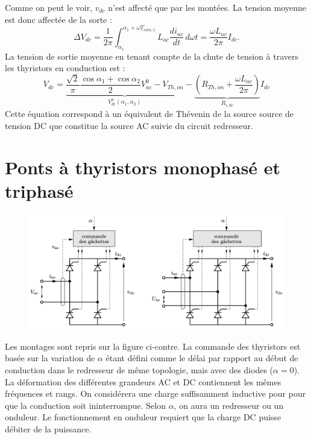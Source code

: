 				Comme on peut le voir, $v_{dc}$ n'est affecté que par les montées. La tension moyenne est donc affectée de la sorte : 
				\begin{equation}
					\Delta V_{dc} = \frac{1}{2\pi} \int _{\alpha _1} ^{\alpha _1 + \omega T_{com,1}} L_{ac} \frac{di_{ac}}{dt} \, d\omega t = \frac{\omega L_{ac}}{2\pi} I_{dc}. 
				\end{equation}
				La tension de sortie moyenne en tenant compte de la chute de tension à travers les thyristors en conduction est :
				\begin{equation}
				V_{dc} = \underbrace{\frac{\sqrt{2}}{\pi} \frac{\cos \alpha _1 + \cos \alpha _2}{2} V_{ac}^0 - V_{Th,on}}_{V_{dc}^0(\alpha _1,\alpha _2)} - \underbrace{\left( R_{Th,on} + \frac{\omega L_{ac}}{2\pi} \right)}_{R_{i,dc}}I_{dc}
				\end{equation}
				Cette équation correspond à un équivalent de Thévenin de la source source de tension DC que constitue la source AC suivie du circuit redresseur. 
				
	\section{Ponts à thyristors monophasé et triphasé}
		\begin{figure}
		\vspace{-5mm}
		\includegraphics[scale=0.3]{ch3/5}
		\end{figure}
		Les montages sont repris sur la figure ci-contre. La commande des thyristors est basée sur la variation de $\alpha$ étant défini comme le délai par rapport au début de conduction dans le redresseur de même topologie, mais avec des diodes ($\alpha = 0$). La déformation des différentes grandeurs AC et DC contiennent les mêmes fréquences et rangs. On considérera une charge suffisamment inductive pour pour que la conduction soit ininterrompue. Selon $\alpha$, on aura un redresseur ou un onduleur. Le fonctionnement en onduleur requiert que la charge DC puisse débiter de la puissance. 
		
